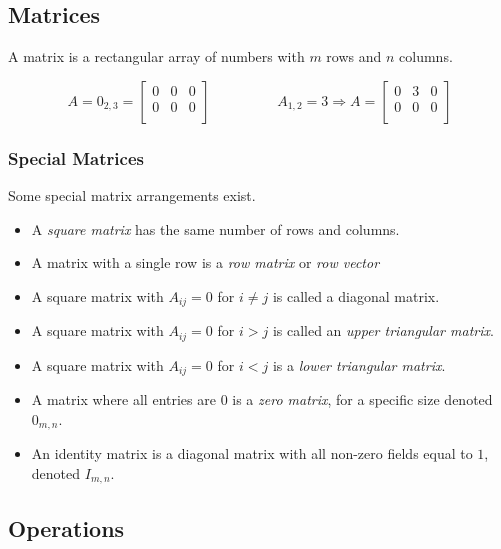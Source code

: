 \documentclass[12pt]{report}
\begin{document}
\begin{flushleft}
\section*{Matrices}

A matrix is a rectangular array of numbers with \(m\) rows and \(n\) columns.

\[  A = 0_{2,3} =
    \left[\begin{array}{ccc}
        0 & 0 & 0 \\
        0 & 0 & 0 \\
    \end{array}\right]
    \hspace{2cm}
    A_{1,2} = 3 \Rightarrow
    A = \left[\begin{array}{ccc}
        0 & 3 & 0 \\
        0 & 0 & 0 \\
    \end{array}\right]
\]

\subsubsection*{Special Matrices}

Some special matrix arrangements exist.
\begin{itemize}
    \item A \textit{square matrix} has the same number of rows and columns.
    \item A matrix with a single row is a \textit{row matrix} or \textit{row
        vector}
    \item A square matrix with \(A_{ij} = 0\) for \(i \neq j\) is called a
        diagonal matrix.
    \item A square matrix with \(A_{ij} = 0\) for \(i > j\) is called an
        \textit{upper triangular matrix}.
    \item A square matrix with \(A_{ij} = 0\) for \(i < j\) is a \textit{lower
        triangular matrix}.
    \item A matrix where all entries are \(0\) is a \textit{zero matrix}, for
        a specific size denoted \(0_{m,n}\).
    \item An identity matrix is a diagonal matrix with all non-zero fields equal
        to \(1\), denoted \(I_{m,n}\).
\end{itemize}

\subsection*{Operations}


\end{flushleft}
\end{document}
